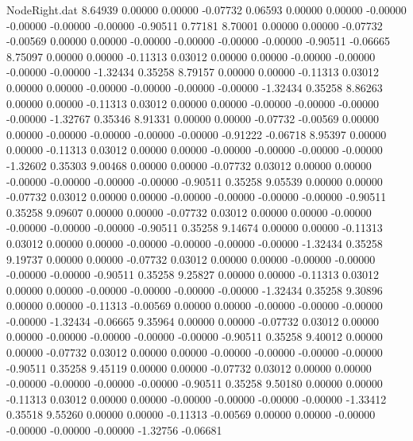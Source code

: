 \begin{filecontents}{NodeRight.dat}
   8.64939    0.00000    0.00000    -0.07732    0.06593    0.00000    0.00000   -0.00000   -0.00000   -0.00000   -0.00000   -0.90511    0.77181
   8.70001    0.00000    0.00000    -0.07732   -0.00569    0.00000    0.00000   -0.00000   -0.00000   -0.00000   -0.00000   -0.90511   -0.06665
   8.75097    0.00000    0.00000    -0.11313    0.03012    0.00000    0.00000   -0.00000   -0.00000   -0.00000   -0.00000   -1.32434    0.35258
   8.79157    0.00000    0.00000    -0.11313    0.03012    0.00000    0.00000   -0.00000   -0.00000   -0.00000   -0.00000   -1.32434    0.35258
   8.86263    0.00000    0.00000    -0.11313    0.03012    0.00000    0.00000   -0.00000   -0.00000   -0.00000   -0.00000   -1.32767    0.35346
   8.91331    0.00000    0.00000    -0.07732   -0.00569    0.00000    0.00000   -0.00000   -0.00000   -0.00000   -0.00000   -0.91222   -0.06718
   8.95397    0.00000    0.00000    -0.11313    0.03012    0.00000    0.00000   -0.00000   -0.00000   -0.00000   -0.00000   -1.32602    0.35303
   9.00468    0.00000    0.00000    -0.07732    0.03012    0.00000    0.00000   -0.00000   -0.00000   -0.00000   -0.00000   -0.90511    0.35258
   9.05539    0.00000    0.00000    -0.07732    0.03012    0.00000    0.00000   -0.00000   -0.00000   -0.00000   -0.00000   -0.90511    0.35258
   9.09607    0.00000    0.00000    -0.07732    0.03012    0.00000    0.00000   -0.00000   -0.00000   -0.00000   -0.00000   -0.90511    0.35258
   9.14674    0.00000    0.00000    -0.11313    0.03012    0.00000    0.00000   -0.00000   -0.00000   -0.00000   -0.00000   -1.32434    0.35258
   9.19737    0.00000    0.00000    -0.07732    0.03012    0.00000    0.00000   -0.00000   -0.00000   -0.00000   -0.00000   -0.90511    0.35258
   9.25827    0.00000    0.00000    -0.11313    0.03012    0.00000    0.00000   -0.00000   -0.00000   -0.00000   -0.00000   -1.32434    0.35258
   9.30896    0.00000    0.00000    -0.11313   -0.00569    0.00000    0.00000   -0.00000   -0.00000   -0.00000   -0.00000   -1.32434   -0.06665
   9.35964    0.00000    0.00000    -0.07732    0.03012    0.00000    0.00000   -0.00000   -0.00000   -0.00000   -0.00000   -0.90511    0.35258
   9.40012    0.00000    0.00000    -0.07732    0.03012    0.00000    0.00000   -0.00000   -0.00000   -0.00000   -0.00000   -0.90511    0.35258
   9.45119    0.00000    0.00000    -0.07732    0.03012    0.00000    0.00000   -0.00000   -0.00000   -0.00000   -0.00000   -0.90511    0.35258
   9.50180    0.00000    0.00000    -0.11313    0.03012    0.00000    0.00000   -0.00000   -0.00000   -0.00000   -0.00000   -1.33412    0.35518
   9.55260    0.00000    0.00000    -0.11313   -0.00569    0.00000    0.00000   -0.00000   -0.00000   -0.00000   -0.00000   -1.32756   -0.06681

\end{filecontents}
